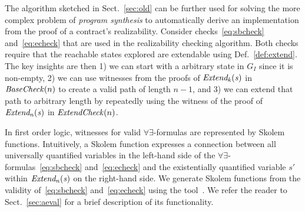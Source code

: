 The algorithm sketched in Sect.~\ref{sec:old} can be further used for solving the more complex problem of
\emph{program synthesis} to automatically derive an implementation from the proof of a contract's realizability. 
Consider checks~\eqref{eq:sbcheck}
and~\eqref{eq:echeck} that are used in the realizability checking
algorithm. Both checks require that the reachable states explored are
extendable using Def.~\ref{def:extend}. The key insights are then 1)
we can start with a arbitrary state in $G_I$ since it is non-empty, 2)
we can use witnesses from the proofs of ${\mathit {Extend_{k}(s)}}$ in
${\mathit {BaseCheck}}(n)$ to create a valid path of length $n-1$, and 3) we
can extend that path to arbitrary length by repeatedly using the
witness of the proof of ${\mathit {Extend_{n}(s)}}$ in
${\mathit {ExtendCheck}}(n)$.

In first order logic, witnesses for valid $\forall\exists$-formulas
are represented by Skolem functions. Intuitively, a Skolem function
expresses a connection between all universally quantified variables in
the left-hand side of the $\forall\exists$-formulas~\eqref{eq:sbcheck}
and~\eqref{eq:echeck} and the existentially quantified variable $s'$
within ${\mathit {Extend_{n}(s)}}$  on the right-hand side. We generate Skolem functions from the validity of~\eqref{eq:sbcheck} and~\eqref{eq:echeck} using the \aeval tool~\cite{fedyukovich2015automated}. We refer the reader to Sect.~\ref{sec:aeval} for a brief description of its functionality.



